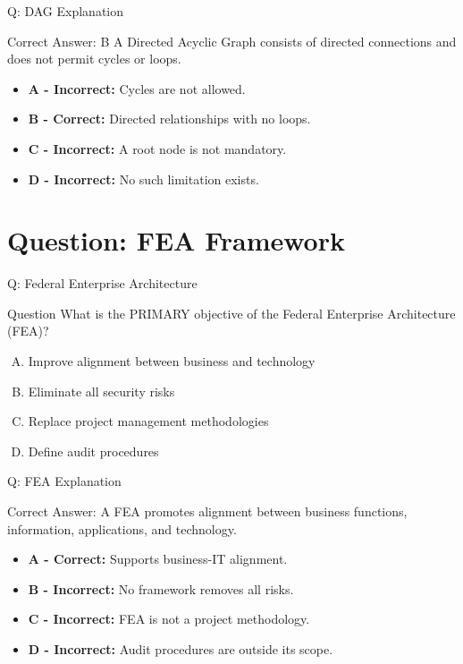\documentclass{beamer}
\begin{document}
	\begin{frame}{Q: DAG Explanation}
		\begin{block}{Correct Answer: B}
			A Directed Acyclic Graph consists of directed connections
			and does not permit cycles or loops.
		\end{block}
		
		\begin{itemize}
			\item \textbf{A - Incorrect:} Cycles are not allowed.
			\item \textbf{B - Correct:} Directed relationships with no loops.
			\item \textbf{C - Incorrect:} A root node is not mandatory.
			\item \textbf{D - Incorrect:} No such limitation exists.
		\end{itemize}
	\end{frame}
	
	\section{Question: FEA Framework}
	
	\begin{frame}{Q: Federal Enterprise Architecture}
		\begin{block}{Question}
			What is the PRIMARY objective of the Federal Enterprise Architecture (FEA)?
		\end{block}
		
		\begin{enumerate}[(A)]
			\item Improve alignment between business and technology
			\item Eliminate all security risks
			\item Replace project management methodologies
			\item Define audit procedures
		\end{enumerate}
	\end{frame}
	
	\begin{frame}{Q: FEA Explanation}
		\begin{block}{Correct Answer: A}
			FEA promotes alignment between business functions,
			information, applications, and technology.
		\end{block}
		
		\begin{itemize}
			\item \textbf{A - Correct:} Supports business-IT alignment.
			\item \textbf{B - Incorrect:} No framework removes all risks.
			\item \textbf{C - Incorrect:} FEA is not a project methodology.
			\item \textbf{D - Incorrect:} Audit procedures are outside its scope.
		\end{itemize}
	\end{frame}
	
\end{document}
